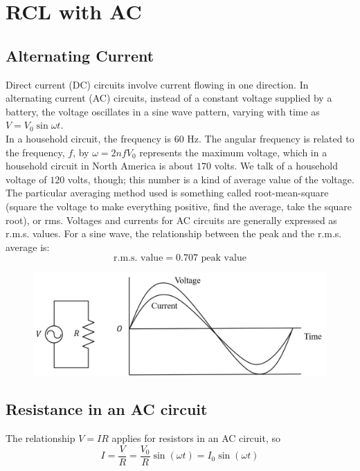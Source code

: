\documentclass[../main.tex]{subfiles}
\begin{document}
\chapter{RCL with AC}
\section{Alternating Current}
Direct current (DC) circuits involve current flowing in one direction. In alternating current (AC) circuits, instead of a constant voltage supplied by a battery, the voltage oscillates in a sine wave pattern, varying with time as $ V = V_0 \sin \omega t $.\\

In a household circuit, the frequency is $ 60 $ Hz. The angular frequency is related to the frequency, $ f $, by $ \omega = 2nfV_0 $ represents the maximum voltage, which in a household circuit in North America is about $ 170 $ volts. We talk of a household voltage of $ 120 $ volts, though; this number is a kind of average value of the voltage. The particular averaging method used is something called root-mean-square (square the voltage to make everything positive, find the average, take the square root), or rms. Voltages and currents for AC circuits are generally expressed as r.m.s. values. For a sine wave, the relationship between the peak and the r.m.s. average is:
\[\text{r.m.s. value} =0.707 \text{ peak value}\]
\begin{figure}[ht]
    \centering
    \includegraphics[scale=.75]{ac-circuit-1.png}
\end{figure}
\section{Resistance in an AC circuit}
The relationship $ V=IR $ applies for resistors in an AC circuit, so 
\[
    I=\frac{V}{R}=\frac{V_0}{R}\sin(\omega t)=I_0\sin(\omega t)
\]
\end{document}
